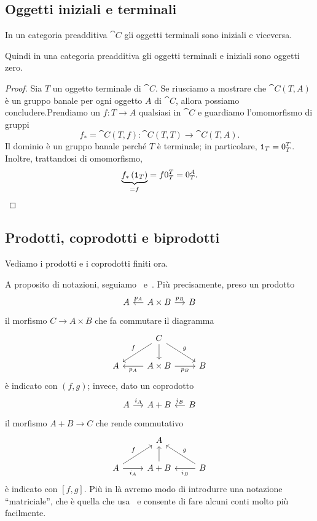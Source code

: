 \subsection{Oggetti iniziali e terminali}

\begin{proposition}
  In un categoria preadditiva \(\cat C\) gli oggetti terminali sono
  iniziali e viceversa.
\end{proposition}

Quindi in una categoria preadditiva gli oggetti terminali e iniziali
sono oggetti zero.

\begin{proof}
  Sia \(T\) un oggetto terminale di \(\cat C\). Se riusciamo a mostrare
  che \(\cat C(T, A)\) è un gruppo banale per ogni oggetto \(A\) di
  \(\cat C\), allora possiamo concludere.\newline Prendiamo un
  \(f : T \to A\) qualsiasi in \(\cat C\) e guardiamo l'omomorfismo di
  gruppi
  \[
    f_\ast = \cat C(T, f) : \cat C(T, T) \to \cat C(T, A) .
  \]
  Il dominio è un gruppo banale perché \(T\) è terminale; in
  particolare, \(\mathtt 1_T = 0_T^T\). Inoltre, trattandosi di omomorfismo,
  \[
    \underbrace{f_\ast \left(\id_T\right)}_{= f} = f 0_T^T = 0_T^A
    . \qedhere
  \]
\end{proof}


\subsection{Prodotti, coprodotti e biprodotti}

Vediamo i prodotti e i coprodotti finiti ora.

\begin{notation}
  A proposito di notazioni, seguiamo~\cite{leinster:categories}
  e~\cite{riehl:categories}. Più precisamente, preso un prodotto
  \[
    \begin{tikzcd}[column sep=small]
      A & A \times B \ar["{p_A}", l, swap] \ar["{p_B}", r] & B
    \end{tikzcd}
  \]
  il morfismo \(C \to A \times B\) che fa commutare il diagramma
  \[
    \begin{tikzcd}
      & C \ar["{f}", dl, swap] \ar[d] \ar["{g}", dr] \\
      A & A \times B \ar["{p_A}", l] \ar["{p_B}", r, swap] & B
    \end{tikzcd}
  \]
  è indicato con \((f, g)\); invece, dato un coprodotto
  \[
    \begin{tikzcd}[column sep=small]
      A \ar["{i_A}", r] & A + B & B \ar["{i_B}", l, swap]
    \end{tikzcd}
  \]
  il morfismo \(A+B \to C\) che rende commutativo
  \[
    \begin{tikzcd}
      & A \\
      A \ar["{i_A}", r, swap] \ar["{f}", ur] & A + B \ar[u] & B
      \ar["{i_B}", l] \ar["{g}", ul, swap]
    \end{tikzcd}
  \]
  è indicato con \([f, g]\). Più in là avremo modo di introdurre una
  notazione ``matriciale'', che è quella che
  usa~\cite{buehler:exactcategories} e consente di fare alcuni conti
  molto più facilmente.
\end{notation}

